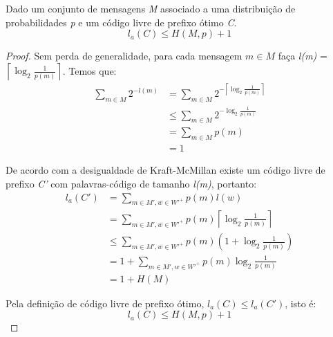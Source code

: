 \begin{lemma} Dado um conjunto de mensagens \emph{M} associado a uma distribuição de probabilidades \emph{p} e um código livre de prefixo ótimo \emph{C}.
\begin{equation*}
l_a(C) \leq H(M, p) + 1
\end{equation*}

\begin{proof}
Sem perda de generalidade, para cada mensagem $m \in M$ faça \emph{l(m)} = $\left \lceil{\log_2 \frac{1}{p(m)} }\right \rceil $. Temos que:
\begin{align*}
\sum_{m \in M}^{} 2^{-l(m)} &= \sum_{m \in M}^{} 2^{-\left \lceil{\log_2 \frac{1}{p(m)} }\right \rceil} \\
&\leq \sum_{m \in M}^{} 2^{-{\log_2 \frac{1}{p(m)} }} \\
&= \sum_{m \in M}^{} p(m) \\
&= 1
\end{align*}

De acordo com a desigualdade de Kraft-McMillan existe um código livre de prefixo \emph{C'}  com palavras-código de tamanho \emph{l(m)}, portanto:
\begin{align*}
l_a(C') &=  \sum_{m \in M', w \in W'^+}^{}p(m) l(w) \\
&=  \sum_{m \in M', w \in W'^+}^{}p(m) \left \lceil{\log_2 \frac{1}{p(m)} }\right \rceil \\
&\leq \sum_{m \in M', w \in W'^+}^{}p(m) (1 + \log_2 \frac{1}{p(m)}) \\
&= 1 +  \sum_{m \in M', w \in W'^+}^{}p(m) \log_2 \frac{1}{p(m)} \\
&= 1 + H(M)
\end{align*}

Pela definição de código livre de prefixo ótimo, $l_a(C) \leq l_a(C')$, isto é:
\begin{equation*}
l_a(C) \leq H(M, p) + 1 
\end{equation*}
\end{proof}
\end{lemma}




